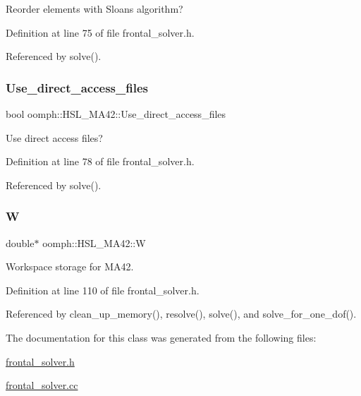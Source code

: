 Reorder elements with Sloan\textquotesingle{}s algorithm? 



Definition at line 75 of file frontal\+\_\+solver.\+h.



Referenced by solve().

\mbox{\label{classoomph_1_1HSL__MA42_a2f3365a6349136a32fcb4096851f7a70}} 
\subsubsection{\texorpdfstring{Use\+\_\+direct\+\_\+access\+\_\+files}{Use\_direct\_access\_files}}
{\footnotesize\ttfamily bool oomph\+::\+H\+S\+L\+\_\+\+M\+A42\+::\+Use\+\_\+direct\+\_\+access\+\_\+files\hspace{0.3cm}{\ttfamily [private]}}



Use direct access files? 



Definition at line 78 of file frontal\+\_\+solver.\+h.



Referenced by solve().

\mbox{\label{classoomph_1_1HSL__MA42_ad12e72f377a117d7a106af587bcf4cac}} 
\subsubsection{\texorpdfstring{W}{W}}
{\footnotesize\ttfamily double$\ast$ oomph\+::\+H\+S\+L\+\_\+\+M\+A42\+::W\hspace{0.3cm}{\ttfamily [private]}}



Workspace storage for M\+A42. 



Definition at line 110 of file frontal\+\_\+solver.\+h.



Referenced by clean\+\_\+up\+\_\+memory(), resolve(), solve(), and solve\+\_\+for\+\_\+one\+\_\+dof().



The documentation for this class was generated from the following files\+:\begin{DoxyCompactItemize}
\item 
\hyperlink{frontal__solver_8h}{frontal\+\_\+solver.\+h}\item 
\hyperlink{frontal__solver_8cc}{frontal\+\_\+solver.\+cc}\end{DoxyCompactItemize}
